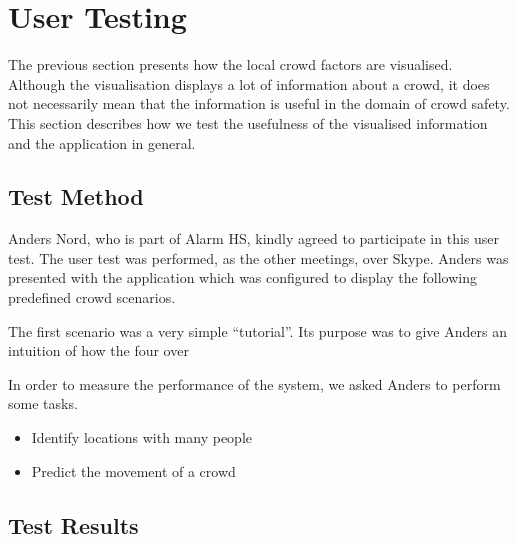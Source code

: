 \section{User Testing} \label{sec:s4_test}

The previous section presents how the local crowd factors are visualised. Although the visualisation displays a lot of information about a crowd, it does not necessarily mean that the information is useful in the domain of crowd safety. This section describes how we test the usefulness of the visualised information and the application in general.

\subsection{Test Method}
Anders Nord, who is part of Alarm HS, kindly agreed to participate in this user test. The user test was performed, as the other meetings, over Skype. Anders was presented with the application which was configured to display the following predefined crowd scenarios.

The first scenario was a very simple \enquote{tutorial}. Its purpose was to give Anders an intuition of how the four over

In order to measure the performance of the system, we asked Anders to perform some tasks.

\begin{itemize}
    \item Identify locations with many people
    \item Predict the movement of a crowd
\end{itemize}

\subsection{Test Results}


